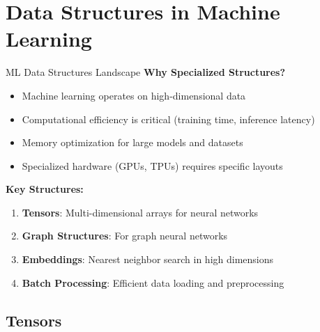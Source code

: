 \documentclass[aspectratio=169,xcolor=dvipsnames]{beamer}
\begin{document}
\section{Data Structures in Machine Learning}

\begin{frame}{ML Data Structures Landscape}
  \textbf{Why Specialized Structures?}
  \begin{itemize}
    \item Machine learning operates on high-dimensional data
    \item Computational efficiency is critical (training time, inference latency)
    \item Memory optimization for large models and datasets
    \item Specialized hardware (GPUs, TPUs) requires specific layouts
  \end{itemize}

  \vspace{0.3cm}
  \textbf{Key Structures:}
  \begin{enumerate}
    \item \textbf{Tensors}: Multi-dimensional arrays for neural networks
    \item \textbf{Graph Structures}: For graph neural networks
    \item \textbf{Embeddings}: Nearest neighbor search in high dimensions
    \item \textbf{Batch Processing}: Efficient data loading and preprocessing
  \end{enumerate}
\end{frame}

\subsection{Tensors}
\end{document}
